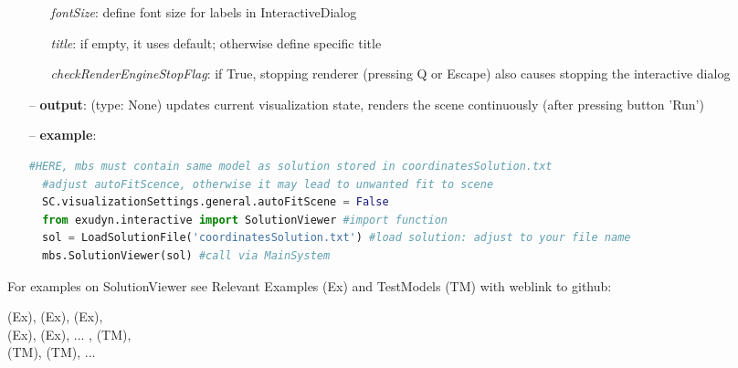 \begin{itemize}[leftmargin=0.7cm]
\begin{itemize}[leftmargin=1.2cm]
\item[]{\it fontSize}: define font size for labels in InteractiveDialog
\item[]{\it title}: if empty, it uses default; otherwise define specific title
\item[]{\it checkRenderEngineStopFlag}: if True, stopping renderer (pressing Q or Escape) also causes stopping the interactive dialog
\end{itemize}
\item[--]
{\bf output}: (type: None) updates current visualization state, renders the scene continuously (after pressing button 'Run')
\item[--]
{\bf example}: \vspace{-12pt}\ei\begin{lstlisting}[language=Python, xleftmargin=36pt]
  #HERE, mbs must contain same model as solution stored in coordinatesSolution.txt
  #adjust autoFitScence, otherwise it may lead to unwanted fit to scene
  SC.visualizationSettings.general.autoFitScene = False
  from exudyn.interactive import SolutionViewer #import function
  sol = LoadSolutionFile('coordinatesSolution.txt') #load solution: adjust to your file name
  mbs.SolutionViewer(sol) #call via MainSystem
\end{lstlisting}\vspace{-24pt}\bi\item[]\vspace{-24pt}\vspace{12pt}\end{itemize}
%

%
\noindent For examples on SolutionViewer see Relevant Examples (Ex) and TestModels (TM) with weblink to github:
\bi
 \item \footnotesize {} (Ex), 
 (Ex), 
 (Ex), 
\\  (Ex), 
 (Ex), 
 ...
, 
 (TM), 
\\  (TM), 
 (TM), 
 ...

